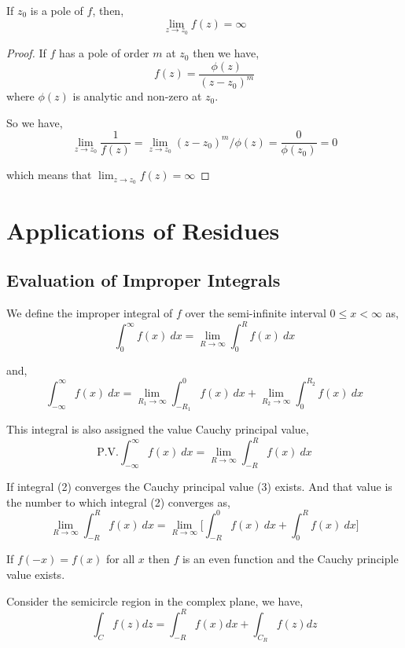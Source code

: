 \begin{theorem}
   If $z_0$ is a pole of $f$, then, 
   $$ \lim_{z \to z_0} f(z) = \infty $$ 
\end{theorem}
\begin{proof}
   If $f$ has a pole of order $m$ at $z_0$ then we have, 
   $$ f(z) = \frac{\phi(z)}{(z - z_0)^{m}} $$ 
   where $\phi(z)$ is analytic and non-zero at $z_0$.

   So we have, 
   $$ \lim_{z \to z_0} \frac{1}{f(z)} = \lim_{z \to z_0} (z - z_0)^{m}/\phi(z) = \frac{0}{\phi(z_0)} = 0 $$ 

   which means that $\lim_{z \to z_0} f(z) = \infty$
\end{proof}

\chapter{Applications of Residues}
\section{Evaluation of Improper Integrals}

We define the improper integral of $f$ over the semi-infinite interval $0 \le x < \infty$ as, 
$$ \int_{{0}}^{{\infty}} {f(x)} \: d{x} = \lim_{R \to \infty} \int_{{0}}^{{R}} {f(x)} \: d{x} {} $$ 

and, 
$$ \int_{{-\infty}}^{{\infty}} {f(x)} \: d{x} = \lim_{R_1 \to \infty} \int_{{-R_1}}^{{0}} {f(x)} \: d{x} + \lim_{R_2 \to \infty} \int_{{0}}^{{R_2}} {f(x)} \: d{x} {}$$  

This integral is also assigned the value Cauchy principal value,  
$$ \text{P.V.} \int_{{-\infty}}^{{\infty}} {f(x)} \: d{x} = \lim_{R \to \infty} \int_{{-R}}^{{R}} {f(x)} \: d{x} {}$$ 

If integral (2) converges the Cauchy principal value  (3) exists. And that value is the number to which integral (2) converges as, 
$$ \lim_{R \to \infty} \int_{{-R}}^{{R}} {f(x)} \: d{x} = \lim_{R \to \infty} \bigg [\int_{{-R}}^{{0}} {f(x)} \: d{x} + \int_{{0}}^{{R}} {f(x)} \: d{x} {} \bigg] $$ 


If $f(-x) = f(x)$ for all $x$ then $f$ is an even function and the Cauchy principle value exists.

Consider the semicircle region in the complex plane, we have, 
$$ \int_C f(z) dz = \int_{-R}^{R} f(x)dx + \int_{C_R} f(z) dz $$ 


